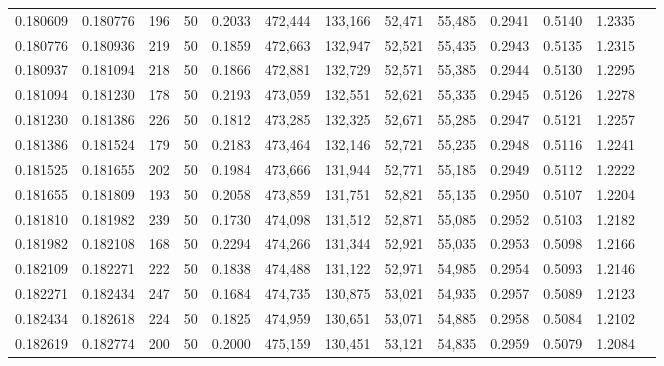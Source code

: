 \begin{tabular}{rrrrrrrrrrrrr}
0.180609 & 0.180776 &   196 &  50 &                                     0.2033 & 472,444 & 133,166 &  52,471 &  55,485 & 0.2941 & 0.5140 & 1.2335 \\
0.180776 & 0.180936 &   219 &  50 &                                     0.1859 & 472,663 & 132,947 &  52,521 &  55,435 & 0.2943 & 0.5135 & 1.2315 \\
0.180937 & 0.181094 &   218 &  50 &                                     0.1866 & 472,881 & 132,729 &  52,571 &  55,385 & 0.2944 & 0.5130 & 1.2295 \\
0.181094 & 0.181230 &   178 &  50 &                                     0.2193 & 473,059 & 132,551 &  52,621 &  55,335 & 0.2945 & 0.5126 & 1.2278 \\
0.181230 & 0.181386 &   226 &  50 &                                     0.1812 & 473,285 & 132,325 &  52,671 &  55,285 & 0.2947 & 0.5121 & 1.2257 \\
0.181386 & 0.181524 &   179 &  50 &                                     0.2183 & 473,464 & 132,146 &  52,721 &  55,235 & 0.2948 & 0.5116 & 1.2241 \\
0.181525 & 0.181655 &   202 &  50 &                                     0.1984 & 473,666 & 131,944 &  52,771 &  55,185 & 0.2949 & 0.5112 & 1.2222 \\
0.181655 & 0.181809 &   193 &  50 &                                     0.2058 & 473,859 & 131,751 &  52,821 &  55,135 & 0.2950 & 0.5107 & 1.2204 \\
0.181810 & 0.181982 &   239 &  50 &                                     0.1730 & 474,098 & 131,512 &  52,871 &  55,085 & 0.2952 & 0.5103 & 1.2182 \\
0.181982 & 0.182108 &   168 &  50 &                                     0.2294 & 474,266 & 131,344 &  52,921 &  55,035 & 0.2953 & 0.5098 & 1.2166 \\
0.182109 & 0.182271 &   222 &  50 &                                     0.1838 & 474,488 & 131,122 &  52,971 &  54,985 & 0.2954 & 0.5093 & 1.2146 \\
0.182271 & 0.182434 &   247 &  50 &                                     0.1684 & 474,735 & 130,875 &  53,021 &  54,935 & 0.2957 & 0.5089 & 1.2123 \\
0.182434 & 0.182618 &   224 &  50 &                                     0.1825 & 474,959 & 130,651 &  53,071 &  54,885 & 0.2958 & 0.5084 & 1.2102 \\
0.182619 & 0.182774 &   200 &  50 &                                     0.2000 & 475,159 & 130,451 &  53,121 &  54,835 & 0.2959 & 0.5079 & 1.2084 \\

\end{tabular}

